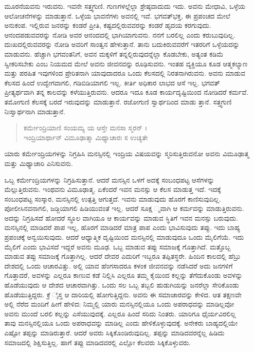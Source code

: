 ಮೂರನೆಯವನು ಇರುವನು. ಇವನೇ ಸತ್ತ್ವಗುಣಿ. ಗುಣಗಳಲ್ಲೆಲ್ಲಾ ಶ್ರೇಷ್ಠವಾದುದು ಇದು. ಅವನು ಮೇಧಾವಿ, ಒಳ್ಳೆಯ ಆಲೋಚನೆಗಳನ್ನು ಮಾಡುತ್ತಾನೆ. ಒಳ್ಳೆಯ ಭಾವನೆಗಳು ಅವನಲ್ಲಿ ಇವೆ. ಭಗವತ್​ಭಕ್ತ, ಈ ಪ್ರಪಂಚದ ಮೇಲೆ ಅನುಕಂಪ. ಇಲ್ಲಿರುವ ಜನರನ್ನು ಕಂಡರೆ ಪ್ರೀತಿ, ಕಷ್ಟದಲ್ಲಿರುವವರನ್ನು ಕಂಡರೆ ಹೃದಯ ಕರಗುವುದು. ಆನಂದಪಡುವವರನ್ನು ನೋಡಿ ಅವರ ಆನಂದದಲ್ಲಿ ಭಾಗಿಯಾಗುವನು. ನನಗೆ ಬರಲಿಲ್ಲ ಎಂದು ಕರುಬುವುದಿಲ್ಲ. ದುಃಖದಲ್ಲಿರುವವರನ್ನು ನೋಡಿ ಅವರಿಗೆ ಸಾಂತ್ವನ ಹೇಳುತ್ತಾನೆ. ತಾನು ಬದುಕಿರುವವರೆಗೆ ಇತರರಿಗೆ ಒಳ್ಳೆಯದನ್ನು ಮಾಡುವನು. ಹೆಚ್ಚಾಗಿ ಭಗವಂತನಿಗೆ, ಅವನ ಮಕ್ಕಳಿಗೆ ತನ್ನಲ್ಲಿರುವುದನ್ನೆಲ್ಲಾ ಕೊಡಬೇಕು, ಅತ್ಯಂತ ಕಡಿಮೆ ಸ್ವೀಕರಿಸಬೇಕು ಎಂಬ ನಿಯಮದ ಮೇಲೆ ಅವನು ಜೀವನವನ್ನು ರೂಢಿಸುವನು. ಇಂತಹ ವ್ಯಕ್ತಿಯೂ ಕೂಡ ಆತ್ಮಕಲ್ಯಾಣ ಮತ್ತು ಪರಹಿತ ಇವುಗಳಿಂದ ಪ್ರೇರಿತನಾಗಿ ಯಾವುದಾದರೂ ಒಂದು ಕೆಲಸದಲ್ಲಿ ನಿರತನಾಗಿರುವನು. ಅವನು ಮಾಡುವ ಕೆಲಸದ ಹಿಂದೆ ಉದ್ವೇಗವಾಗಲಿ, ಗಡಿಬಿಡಿಯಾಗಲಿ ಇಲ್ಲ. ಕೀರ್ತಿ ಅಧಿಕಾರ ಲಾಭದ ಆಸೆ ಇಲ್ಲ. ಭಗವತ್ ಪ್ರೀತ್ಯರ್ಥವಾಗಿ ತನ್ನ ಕಾಲವನ್ನು ಕಳೆಯುತ್ತಿರುವನು. ಆದರೂ ಇದೂ ಕೂಡ ಕಾರ್ಯದೃಷ್ಟಿಯಿಂದ ನೋಡಿದರೆ ಕರ್ಮವೆ. ತಮೋಗುಣಿ ಕೆಲಸಕ್ಕೆ ಬರದೆ ಇರುವುದನ್ನು ಮಾಡುತ್ತಾನೆ. ರಜೋಗುಣಿ ಸ್ವಾರ್ಥದಿಂದ ಮಾಡು ತ್ತಾನೆ. ಸತ್ತ್ವಗುಣಿ ನಿಃಸ್ವಾರ್ಥನಾಗಿ ಮಾಡುತ್ತಾನೆ.

\begin{verse}
ಕರ್ಮೇಂದ್ರಿಯಾಣಿ ಸಂಯಮ್ಯ ಯ ಆಸ್ತೇ ಮನಸಾ ಸ್ಮರನ್ ।\\ಇಂದ್ರಿಯಾರ್ಥಾನ್ ವಿಮೂಢಾತ್ಮಾ ಮಿಥ್ಯಾಚಾರಃ ಸ ಉಚ್ಯತೇ 
\end{verse}

{\small ಯಾರು ಕರ್ಮೇಂದ್ರಿಯಗಳನ್ನು ನಿಗ್ರಹಿಸಿ ಮನಸ್ಸಿನಲ್ಲಿ ಇಂದ್ರಿಯ ವಿಷಯವನ್ನು ಸ್ಮರಿಸುತ್ತಿರುವನೋ ಅವನು ವಿಮೂಢಾತ್ಮ ಮತ್ತು ಮಿಥ್ಯಾಚಾರಿ ಎನಿಸುವನು.}

ಒಬ್ಬ ಕರ್ಮೇಂದ್ರಿಯಗಳನ್ನು ನಿಗ್ರಹಿಸುತ್ತಾನೆ. ಆದರೆ ಮನಸ್ಸಿನ ಒಳಗೆ ಅದಕ್ಕೆ ಸಂಬಂಧಪಟ್ಟ ಆಸೆಗಳನ್ನು ಮೆಲ್ಲುತ್ತಿರುವನು. ಇಂಥವನು ವಿಮೂಢಾತ್ಮ. ಏಕೆಂದರೆ ಇವನ ಮನಸ್ಸು ಆ ಕೆಲಸ ಮಾಡುತ್ತ ಇದೆ. ಇದಕ್ಕೆ ಸಂಬಂಧಪಟ್ಟ ಸಂಸ್ಕಾರ, ಮನಸ್ಸಿನಲ್ಲಿ ಉತ್ಪತ್ತಿ ಆಗುತ್ತದೆ. ಇವನು ಮಾಡುವುದು ಹೊರಗೆ ಕಾಣಿಸುವುದಿಲ್ಲ. ಪೋಲೀಸಿನವನಾಗಲಿ, ಜಡ್ಜಿಯಾಗಲಿ ಹಿಡಿಯುವಂತೆ ಇಲ್ಲ. ಆದರೆ ಸೂಕ್ಷ ್ಮವಾಗಿ ಆ ಕರ್ಮವನ್ನು ಮಾಡುತ್ತಿರುವನು. ಅದನ್ನು ನಿಗ್ರಹಿಸದೆ ಹೋದರೆ ಸ್ಥೂಲ ವಾಗಿಯೂ ಆ ಕಾರ್ಯವನ್ನು ಮಾಡುವ ಸ್ಥಿತಿಗೆ ಇವನ ಮನಸ್ಸು ಬರುವುದು. ಮನಸ್ಸಿನಲ್ಲಿ ಮಾಡಿದರೆ ಪಾಪ ಇಲ್ಲ, ಹೊರಗೆ ಮಾಡಿದರೆ ಮಾತ್ರ ಪಾಪ ಎಂದು ಭಾವಿಸುವುದು ತಪ್ಪು. ಇದು ಬಾಹ್ಯ ಪ್ರಪಂಚಕ್ಕೆ ಅನ್ವಯಿಸುವುದು. ಆದರೆ ಆಧ್ಯಾತ್ಮಿಕ ದೃಷ್ಟಿಯಿಂದ ಮನಸ್ಸಿನಲ್ಲಿ ಮಾಡುವುದೂ ಒಂದು ಮೈಲಿಗೆಯೆ. ಇದು ಮೈಲಿಗೆ ಎಂದು ಭಾವಿಸದೆ ಇದ್ದರೆ ಅವನು ಮೂಢ. ಒಬ್ಬ ಮಾಡುವ ತಪ್ಪು ಸಮಾಜಕ್ಕೆ ಗೊತ್ತಾಗಿದೆ. ಮತ್ತೊಬ್ಬ ಮಾಡುವ ತಪ್ಪು ಸಮಾಜಕ್ಕೆ ಗೊತ್ತಾಗಿಲ್ಲ. ಆದರೆ ದೇವರ ಎದುರಿಗೆ ಇಬ್ಬರೂ ತಪ್ಪಿತಸ್ಥರೇ. ಹಿಂದಿನ ಕಾಲದಲ್ಲಿ ಹೆಬ್ರು ದೇಶದಲ್ಲಿ ಒಂದು ಆಚಾರವಿತ್ತು. ಅಲ್ಲಿ ಯಾವ ಹೆಂಗಸಾದರೂ ಕಳಂಕ ಜೀವನವನ್ನು ನಡೆಸಿದರೆ ಅದು ಜನಗಳಿಗೆ ಗೊತ್ತಾದರೆ, ಅವಳನ್ನು ಎಲ್ಲರೂ ಕಾಣುವ ಕಡೆ ನಿಲ್ಲಿಸಿ ಎಲ್ಲರೂ ತಮ್ಮ ಕೈಯಿಂದ ಕಲ್ಲನ್ನು ತೆಗೆದುಕೊಂಡು ಅವಳನ್ನು ಹೊಡೆಯುವುದು ಆ ದೇಶದ ಆಚಾರವಾಗಿತ್ತು. ಒಂದು ಸಲ ಒಬ್ಬ ತಬ್ಬಲಿ ಹುಡುಗಿಯನ್ನು ಜನರೆಲ್ಲಾ ಸೇರಿಕೊಂಡು ಹೊಡೆಯುತ್ತಿದ್ದರು. ಕ್ರೆ ೈಸ್ತ ಆ ದಾರಿಯಲ್ಲಿ ಹೋಗುತ್ತಿದ್ದನು. ಅವನು ಈ ಸಮಾಚಾರವನ್ನು ಕೇಳಿದ. ಆತ ತಕ್ಷಣವೇ ಅಲ್ಲಿ ನೆರೆದ ಮಂದಿಗೆ ಹೀಗೆ ಹೇಳಿದ: ನಿಮ್ಮಲ್ಲಿ ಯಾರು ಮನಸ್ಸಿನಲ್ಲಿಯೂ ಒಂದು ಅಪರಾಧವನ್ನು ಮಾಡಿಲ್ಲವೋ ಅವನು ಮುಂದೆ ಬರಲಿ ಕಲ್ಲನ್ನು ಎಸೆಯುವುದಕ್ಕೆ. ಎಲ್ಲರೂ ಹಿಂದೆ ಸರಿದು ನಿಂತರು. ಯಾರಿಗೂ ಧೈರ್ಯವಿರಲಿಲ್ಲ ತಾವು ಮನಸ್ಸಿನಲ್ಲಿಯೂ ಒಂದು ಅಪರಾಧವನ್ನು ಮಾಡಿಲ್ಲ ಎಂದು ಹೇಳಿಕೊಳ್ಳುವುದಕ್ಕೆ. ಅನೇಕರು ಬಾಹ್ಯದಲ್ಲಿಯೇ ಎಷ್ಟೋ ತಪ್ಪನ್ನು ಮಾಡಿರುತ್ತಾರೆ. ಆದರೆ ಅವರು ಸಿಕ್ಕಿಕೊಂಡಿರುವುದಿಲ್ಲ. ತಪ್ಪನ್ನು ಮಾಡಿದವರನ್ನೆಲ್ಲ ಹಿಡಿದು ಸಮಾಜದಲ್ಲಿ ಶಿಕ್ಷಿಸುತ್ತಿಲ್ಲ. ಹಾಗೆ ತಪ್ಪು ಮಾಡಿದವರಲ್ಲಿ ಎಲ್ಲೋ ಕೆಲವರು ಸಿಕ್ಕಿಕೊಳ್ಳುವರು.

